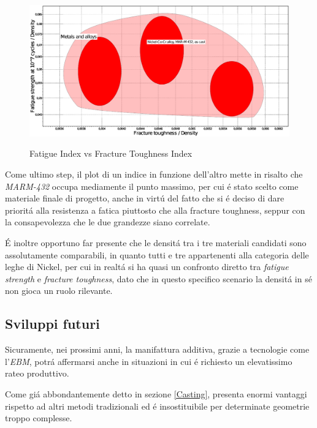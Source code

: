 \documentclass{article}
\begin{document}
        \begin{figure}[h!]
             \label{fig:indici_di_merito}
            \includegraphics[width=\textwidth]{indici.eps}
            \caption{Fatigue Index vs Fracture Toughness Index}
        \end{figure}

        Come ultimo step, il plot di un indice in funzione dell'altro mette in risalto che \textit{MARM-432}
        occupa mediamente il punto massimo, per cui é stato scelto come materiale finale di progetto, 
        anche in virtú del fatto che si é deciso di dare prioritá alla resistenza a fatica piuttosto che 
        alla fracture toughness, seppur con la consapevolezza che le due grandezze siano correlate.

        É inoltre opportuno far presente che le densitá tra i tre materiali candidati sono assolutamente comparabili, 
        in quanto tutti e tre appartenenti alla categoria delle leghe di Nickel, per cui in realtá si ha 
        quasi un confronto diretto tra \textit{fatigue strength} e \textit{fracture toughness}, dato che in questo specifico 
        scenario la densitá in sé non gioca un ruolo rilevante.

        \clearpage

    \subsection{Sviluppi futuri}

    Sicuramente, nei prossimi anni, la manifattura additiva, grazie a tecnologie come l'\textit{EBM}, 
    potrá affermarsi anche in situazioni in cui é richiesto un elevatissimo rateo produttivo. 

    Come giá abbondantemente detto in sezione \ref{Casting}, presenta enormi vantaggi rispetto ad altri 
    metodi tradizionali ed é insostituibile per determinate geometrie troppo complesse. \\
    
\end{document}
